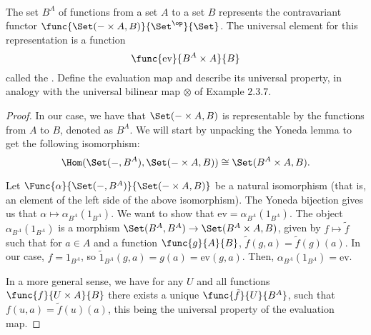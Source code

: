 \documentclass[main.tex]{subfiles}
\begin{document}
\paragraph{}
\begin{exercise}
	The set $B^A$ of functions from a set $A$ to a set $B$ represents the
	contravariant functor $\func{\Set(-\times A, B)}{\Set^\op}{\Set}$. The
	universal element for this representation is a function
	$$\func{\text{ev}}{B^A\times A}{B}$$
	called the . Define the evaluation map and describe its universal property, in analogy with the universal bilinear map $\otimes$ of Example $2.3.7$.
\end{exercise}

\begin{proof}
	In our case, we have that $\Set(-\times A, B)$ is representable by the
	functions from $A$ to $B$, denoted as $B^A$. We will start by unpacking the Yoneda lemma to get the following isomorphism:
	$$
	\Hom(\Set(-,B^A), \Set(-\times A, B))\cong \Set(B^A\times A, B).
	$$

	Let $\Func{\alpha}{\Set(-,B^A)}{\Set(-\times A, B)}$ be a natural
	isomorphism (that is, an element of the left side of the above
	isomorphism). The Yoneda bijection gives us that $\alpha\mapsto
	\alpha_{B^A}(1_{B^A})$. We want to show that $\text{ev} =
	\alpha_{B^A}(1_{B^A})$. The object $\alpha_{B^A}(1_{B^A})$ is a morphism
	$\Set(B^A, B^A)\rightarrow \Set(B^A\times A, B)$, given by $f \mapsto
	\tilde{f}$ such that for $a\in A$ and a function $\func{g}{A}{B}$,
	$\tilde{f}(g,a) = \tilde{f}(g)(a)$. In our case, $f=1_{B^A}$, so
	$\tilde{1}_{B^A}(g,a) = g(a) = \text{ev}(g,a)$. Then,
	$\alpha_{B^A}(1_{B^A}) = \text{ev}$.

	In a more general sense, we have for any $U$ and all functions
	$\func{f}{U\times A}{B}$ there exists a unique $\func{\tilde{f}}{U}{B^A}$,
	such that $f(u,a) = \tilde{f}(u)(a)$, this being the universal property of
	the evaluation map.
\end{proof}
\end{document}
